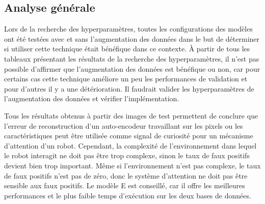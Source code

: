 \subsection{Analyse générale}
    Lors de la recherche des hyperparamètres, toutes les configurations des modèles ont été testées avec et sans l'augmentation des données dans le but de déterminer si utiliser cette technique était bénéfique dans ce contexte. À partir de tous les tableaux présentant les résultats de la recherche des hyperparamètres, il n'est pas possible d'affirmer que l'augmentation des données est bénéfique ou non, car pour certains cas cette technique améliore un peu les performances de validation et pour d'autres il y a une détérioration. Il faudrait valider les hyperparamètres de l'augmentation des données et vérifier l'implémentation.
    \bigskip
    
    Tous les résultats obtenus à partir des images de test permettent de conclure que l'erreur de reconstruction d'un auto-encodeur travaillant sur les pixels ou les caractéristiques peut être utilisée comme signal de curiosité pour un mécanisme d'attention d'un robot. Cependant, la complexité de l'environnement dans lequel le robot interagit ne doit pas être trop complexe, sinon le taux de faux positifs devient bien trop important. Même si l'environnement n'est pas complexe, le taux de faux positifs n'est pas de zéro, donc le système d'attention ne doit pas être sensible aux faux positifs. Le modèle E est conseillé, car il offre les meilleures performances et le plus faible temps d'exécution sur les deux bases de données.